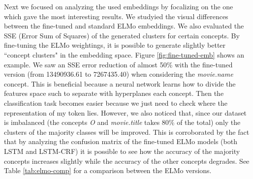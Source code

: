 \documentclass[11pt,a4paper]{article}
\begin{document}
Next we focused on analyzing the used embeddings by focalizing on the one which gave the most interesting results. We studyied the visual differences between the fine-tuned and standard ELMo embeddings. We also evaluated the SSE (Error Sum of Squares) of the generated clusters for certain concepts. By fine-tuning the ELMo weightings, it is possible to generate slightly better ``concept clusters" in the embedding space. Figure \ref{fig:fine-tuned-emb} shows an example. We saw an SSE error reduction of almost 50\% with the fine-tuned version (from 13490936.61 to 7267435.40) when considering the \textit{movie.name} concept. This is beneficial because a neural network learns how to divide the features space such to separate with hyperplanes each concept. Then the classification task becomes easier because we just need to check where the representation of my token lies.  However, we also noticed that, since our dataset is imbalanced (the concepts \textit{O} and \textit{movie.title} takes 80\% of the total) only the clusters of the majority classes will be improved. This is corroborated by the fact that by analyzing the confusion matrix of the fine-tuned ELMo models (both LSTM and LSTM-CRF) it is possible to see how the accuracy of the majority concepts increases slightly while the accuracy of the other concepts degrades. See Table \ref{tab:elmo-comp} for a comparison between the ELMo versions. 

\begin{table}[]
\centering
{}
\caption{Given the major seven concepts from the test dataset, we compute the tagging accuracy when using the LSTM-CRF and the CHAR+POS+NER features. The first five concepts have appear more than 2\% in the entire dataset, while the others appears less than 1\%. It possible to see how the first five performances increases when using the fine-tuned ELMo, while the other two accuracies decreases with respect to the averaged ELMo.}
\label{tab:elmo-comp}
\end{table}
\end{document}
